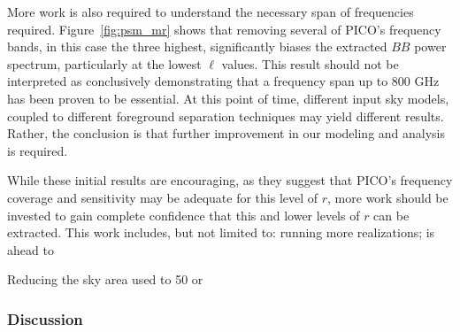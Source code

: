 \documentclass[PICOReport.tex]{subfiles}
\begin{document}
More work is also required to understand the necessary span of frequencies required. Figure~\ref{fig:psm_mr} shows that removing several of PICO's frequency bands, in this case the three highest, significantly biases the extracted $BB$ power spectrum, particularly at the lowest $\ell$ values. This result should not be interpreted as conclusively demonstrating that a frequency span up to 800 GHz has been proven to be essential. At this point of time, different input sky models, coupled to different foreground separation techniques may yield different results. Rather, the conclusion is that further improvement in our modeling and analysis is required. 

While these initial results are encouraging, as they suggest that PICO's frequency coverage and sensitivity may be adequate for this level of $r$, more work should be invested to gain complete confidence that this and lower levels of $r$ can be extracted. This work includes, but not limited to: running more realizations; is ahead to 

Reducing the sky area used to 50 or




 \hspace{0.1in}


\subsubsection{Discussion}
\end{document}
